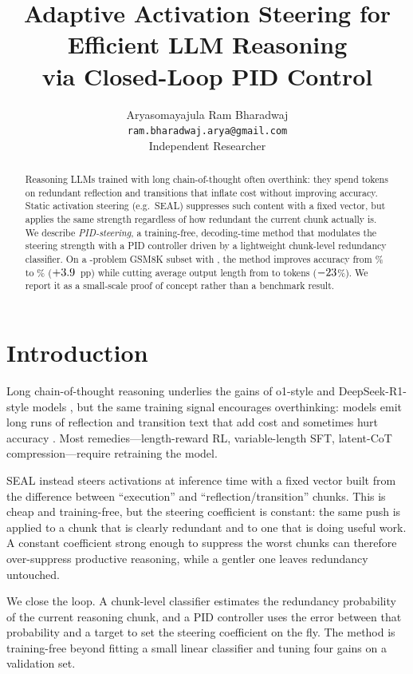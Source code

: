 \documentclass[11pt]{article}
\title{Adaptive Activation Steering for Efficient LLM Reasoning\\via Closed-Loop PID Control}
\author{
  Aryasomayajula Ram Bharadwaj\\
  \texttt{ram.bharadwaj.arya@gmail.com}\\
  Independent Researcher
}
\date{}
\begin{document}
\maketitle

\begin{abstract}
Reasoning LLMs trained with long chain-of-thought often overthink: they spend
tokens on redundant reflection and transitions that inflate cost without
improving accuracy. Static activation steering (e.g.\ SEAL) suppresses such
content with a fixed vector, but applies the same strength regardless of how
redundant the current chunk actually is. We describe \emph{PID-steering}, a
training-free, decoding-time method that modulates the steering strength with a
PID controller driven by a lightweight chunk-level redundancy classifier. On a
\NProblems{}-problem GSM8K subset with \ModelName, the method improves accuracy
from \BaselineAcc\% to \StupidAcc\% ($+3.9$~pp) while cutting average
output length from \BaselineTokens{} to \StupidTokens{} tokens
($-23$\%). We report it as a small-scale proof of concept rather
than a benchmark result.
\end{abstract}

\section{Introduction}

Long chain-of-thought reasoning \cite{wei2022chain} underlies the gains of
o1-style and DeepSeek-R1-style models \cite{guo2025deepseek}, but the same
training signal encourages overthinking: models emit long runs of reflection
and transition text that add cost and sometimes hurt accuracy
\cite{sui2025stop}. Most remedies---length-reward RL, variable-length SFT,
latent-CoT compression---require retraining the model.

SEAL \cite{chen2025seal} instead steers activations at inference time with a
fixed vector built from the difference between ``execution'' and
``reflection/transition'' chunks. This is cheap and training-free, but the
steering coefficient is constant: the same push is applied to a chunk that is
clearly redundant and to one that is doing useful work. A constant coefficient
strong enough to suppress the worst chunks can therefore over-suppress
productive reasoning, while a gentler one leaves redundancy untouched.

We close the loop. A chunk-level classifier estimates the redundancy
probability of the current reasoning chunk, and a PID controller uses the error
between that probability and a target to set the steering coefficient on the
fly. The method is training-free beyond fitting a small linear classifier and
tuning four gains on a validation set.
\end{document}
